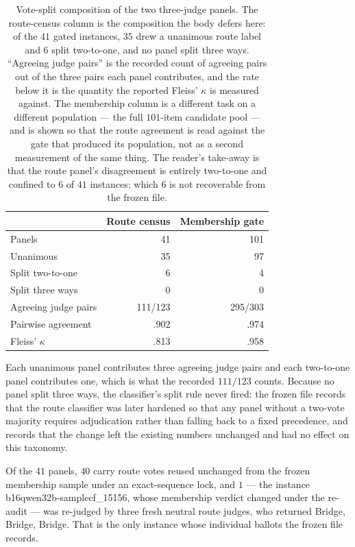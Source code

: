 \documentclass[letterpaper]{article}
\begin{document}
\begin{table}[t]
\centering
\small
\begin{tabular}{lrr}
\toprule
 & Route census & Membership gate \\
\midrule
Panels                  &      41 &     101 \\
Unanimous               &      35 &      97 \\
Split two-to-one        &       6 &       4 \\
Split three ways        &       0 &       0 \\
Agreeing judge pairs    & 111/123 & 295/303 \\
Pairwise agreement      &    .902 &    .974 \\
Fleiss' \(\kappa\)      &    .813 &    .958 \\
\bottomrule
\end{tabular}
\caption{Vote-split composition of the two three-judge panels.  The route-census
column is the composition the body defers here: of the \(41\) gated instances,
\(35\) drew a unanimous route label and \(6\) split two-to-one, and no panel split
three ways.  ``Agreeing judge pairs'' is the recorded count of agreeing pairs out
of the three pairs each panel contributes, and the rate below it is the quantity
the reported Fleiss' \(\kappa\) is measured against.  The membership column is a
different task on a different population --- the full \(101\)-item candidate pool
--- and is shown so that the route agreement is read against the gate that
produced its population, not as a second measurement of the same thing.  The
reader's take-away is that the route panel's disagreement is entirely
two-to-one and confined to \(6\) of \(41\) instances; which \(6\) is not
recoverable from the frozen file.}
\label{tab:s2c-votes}
\end{table}

Each unanimous panel contributes three agreeing judge pairs and each two-to-one
panel contributes one, which is what the recorded \(111/123\) counts.  Because no
panel split three ways, the classifier's split rule never fired: the frozen file
records that the route classifier was later hardened so that any panel without a
two-vote majority requires adjudication rather than falling back to a fixed
precedence, and records that the change left the existing numbers unchanged and
had no effect on this taxonomy.

Of the \(41\) panels, \(40\) carry route votes reused unchanged from the frozen
membership sample under an exact-sequence lock, and \(1\) --- the instance
b16\textbar{}qwen32b-sample\textbar{}cf\_15156, whose membership verdict changed
under the re-audit --- was re-judged by three fresh neutral route judges, who
returned Bridge, Bridge, Bridge.  That is the only instance whose individual
ballots the frozen file records.
\end{document}
